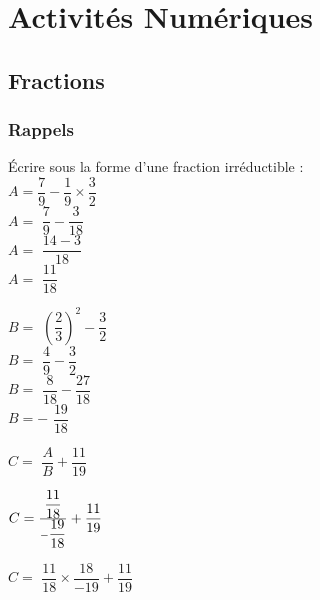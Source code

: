 

\section{Activités Numériques}

\subsection{Fractions}

\subsubsection{Rappels}



Écrire sous la forme d'une fraction irréductible :\\

$ A = ${$\dfrac{7}{9} - \dfrac{1}{9} \times \dfrac{3}{2} $ }\\

$ A = ${  $\dfrac{7}{9} - \dfrac{3}{18} $}\\

$ A = ${  $\dfrac{14-3}{18} $ }\\

$ A = ${  $\dfrac{11}{18} $ }\\

\vspace{1cm}

$ B = ${  $\left(\dfrac{2}{3}\right)^2 - \dfrac{3}{2} $ }\\

$ B = ${  $\dfrac{4}{9} - \dfrac{3}{2} $ }\\

$ B = ${  $\dfrac{8}{18} - \dfrac{27}{18} $} \\

$ B = - ${  $\dfrac{19}{18} $ }\\

\vspace{1cm}

$ C = ${  $\dfrac{A}{B} + \dfrac{11}{19} $ }\\

\vspace{.1cm}

$ C = { \Large \tfrac{\dfrac{11}{18}}{-\dfrac{19}{18}}} + \dfrac{11}{19}$ \\

\vspace{.3cm}

$ C = ${  $\dfrac{11}{18} \times \dfrac{18}{-19} + \dfrac{11}{19} $} \\

